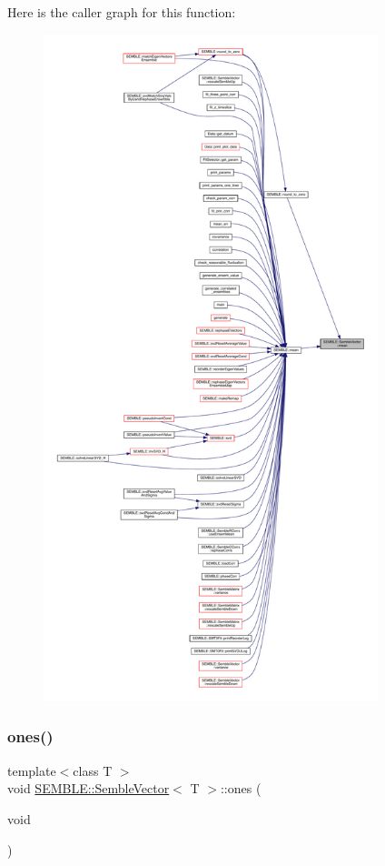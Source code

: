 Here is the caller graph for this function\+:
\nopagebreak
\begin{figure}[H]
\begin{center}
\leavevmode
\includegraphics[height=550pt]{d9/d94/structSEMBLE_1_1SembleVector_acb34740f7232e5d1bf079cf131192322_icgraph}
\end{center}
\end{figure}
\mbox{\label{structSEMBLE_1_1SembleVector_aebc4ff68f93d72431d206ba9bcbb78fb}} 
\subsubsection{\texorpdfstring{ones()}{ones()}\hspace{0.1cm}{\footnotesize\ttfamily [1/2]}}
{\footnotesize\ttfamily template$<$class T $>$ \\
void \mbox{\hyperlink{structSEMBLE_1_1SembleVector}{S\+E\+M\+B\+L\+E\+::\+Semble\+Vector}}$<$ T $>$\+::ones (\begin{DoxyParamCaption}\item[{void}]{ }\end{DoxyParamCaption})}

